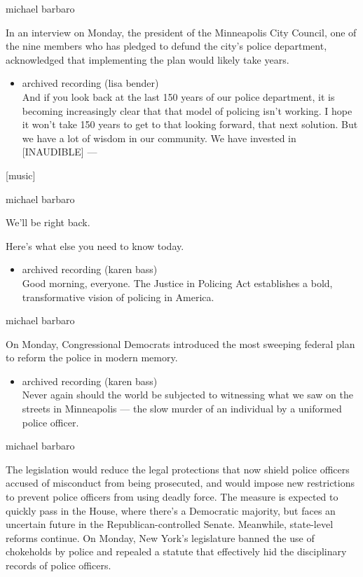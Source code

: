 michael barbaro

In an interview on Monday, the president of the Minneapolis City
Council, one of the nine members who has pledged to defund the city's
police department, acknowledged that implementing the plan would likely
take years.

\begin{itemize}
\tightlist
\item
  archived recording (lisa bender)\\
  And if you look back at the last 150 years of our police department,
  it is becoming increasingly clear that that model of policing isn't
  working. I hope it won't take 150 years to get to that looking
  forward, that next solution. But we have a lot of wisdom in our
  community. We have invested in {[}INAUDIBLE{]} ---
\end{itemize}

{[}music{]}

michael barbaro

We'll be right back.

Here's what else you need to know today.

\begin{itemize}
\tightlist
\item
  archived recording (karen bass)\\
  Good morning, everyone. The Justice in Policing Act establishes a
  bold, transformative vision of policing in America.
\end{itemize}

michael barbaro

On Monday, Congressional Democrats introduced the most sweeping federal
plan to reform the police in modern memory.

\begin{itemize}
\tightlist
\item
  archived recording (karen bass)\\
  Never again should the world be subjected to witnessing what we saw on
  the streets in Minneapolis --- the slow murder of an individual by a
  uniformed police officer.
\end{itemize}

michael barbaro

The legislation would reduce the legal protections that now shield
police officers accused of misconduct from being prosecuted, and would
impose new restrictions to prevent police officers from using deadly
force. The measure is expected to quickly pass in the House, where
there's a Democratic majority, but faces an uncertain future in the
Republican-controlled Senate. Meanwhile, state-level reforms continue.
On Monday, New York's legislature banned the use of chokeholds by police
and repealed a statute that effectively hid the disciplinary records of
police officers.

